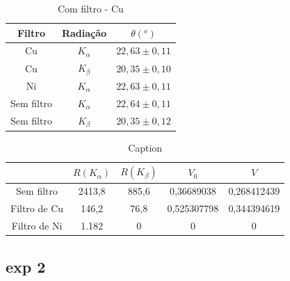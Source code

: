 \documentclass[article,12pt,openright,oneside,a4paper,brazil]{abntex2}
\begin{document}
\begin{table}[H]
    \centering
    \begin{tabular}{|c|c|c|}
        \hline
        Filtro & Radiação & $\theta(^o)$ \\ \hline
        Cu & $K_\alpha$ & $22,63\pm0,11$ \\ \hline
        Cu & $K_\beta$ & $20,35\pm0,10$ \\ \hline
        Ni & $K_\alpha$ & $22,63\pm0,11$ \\ \hline
        Sem filtro & $K_\alpha$ & $22,64\pm0,11$ \\ \hline
        Sem filtro & $K_\beta$ & $20,35\pm0,12$ \\ \hline
    \end{tabular}
    \caption{Com filtro - Cu}
    \label{tab:my_label4}
\end{table}

\begin{table}[H]
    \centering
    \begin{tabular}{|c|c|c|c|c|}
    \hline
         & $R(K_\alpha)$ & $R(K_\beta)$ & $V_0$ & $V$ \\ \hline
        Sem filtro & 2413,8 & 885,6 & 0,36689038 & 0,268412439 \\ \hline
        Filtro de Cu & 146,2 & 76,8 & 0,525307798 & 0,344394619 \\ \hline
        Filtro de Ni & 1.182 & 0 & 0 & 0 \\ \hline 
    \end{tabular}
    \caption{Caption}
    \label{tab:my_label}
\end{table}

\subsection{exp 2}
\end{document}
